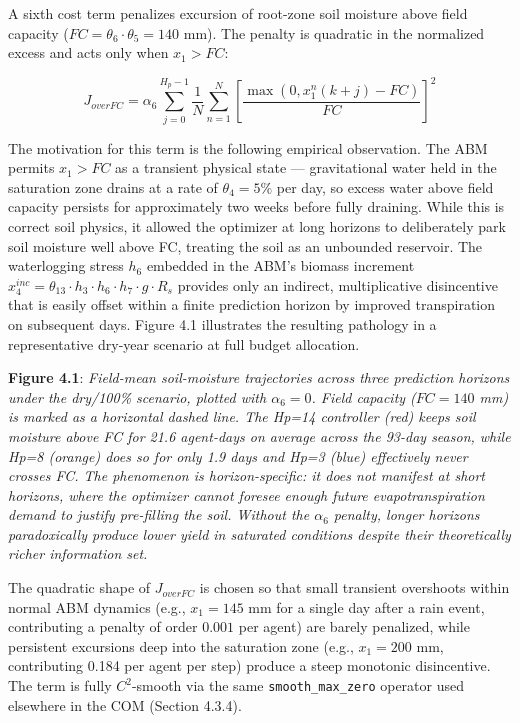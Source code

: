 A sixth cost term penalizes excursion of root-zone soil moisture above
field capacity (\(FC = \theta_6 \cdot \theta_5 = 140\) mm). The penalty
is quadratic in the normalized excess and acts only when \(x_1 > FC\):

\[J_{overFC} = \alpha_6 \sum_{j=0}^{H_p-1} \frac{1}{N} \sum_{n=1}^N \left[ \frac{\max(0, x_1^n(k+j) - FC)}{FC} \right]^2 \tag{15}\]

The motivation for this term is the following empirical observation. The
ABM permits \(x_1 > FC\) as a transient physical state --- gravitational
water held in the saturation zone drains at a rate of \(\theta_4 = 5\%\)
per day, so excess water above field capacity persists for approximately
two weeks before fully draining. While this is correct soil physics, it
allowed the optimizer at long horizons to deliberately park soil
moisture well above FC, treating the soil as an unbounded reservoir. The
waterlogging stress \(h_6\) embedded in the ABM's biomass increment
\(x_4^{inc} = \theta_{13} \cdot h_3 \cdot h_6 \cdot h_7 \cdot g \cdot R_s\)
provides only an indirect, multiplicative disincentive that is easily
offset within a finite prediction horizon by improved transpiration on
subsequent days. Figure 4.1 illustrates the resulting pathology in a
representative dry-year scenario at full budget allocation.

\textbf{Figure 4.1}: \emph{Field-mean soil-moisture trajectories across
three prediction horizons under the dry/100\% scenario, plotted with
\(\alpha_6 = 0\). Field capacity (\(FC = 140\) mm) is marked as a
horizontal dashed line. The Hp=14 controller (red) keeps soil moisture
above FC for 21.6 agent-days on average across the 93-day season, while
Hp=8 (orange) does so for only 1.9 days and Hp=3 (blue) effectively
never crosses FC. The phenomenon is horizon-specific: it does not
manifest at short horizons, where the optimizer cannot foresee enough
future evapotranspiration demand to justify pre-filling the soil.
Without the \(\alpha_6\) penalty, longer horizons paradoxically produce
lower yield in saturated conditions despite their theoretically richer
information set.}

The quadratic shape of \(J_{overFC}\) is chosen so that small transient
overshoots within normal ABM dynamics (e.g., \(x_1 = 145\) mm for a
single day after a rain event, contributing a penalty of order \(0.001\)
per agent) are barely penalized, while persistent excursions deep into
the saturation zone (e.g., \(x_1 = 200\) mm, contributing 0.184 per
agent per step) produce a steep monotonic disincentive. The term is
fully \(C^2\)-smooth via the same \texttt{smooth\_max\_zero} operator
used elsewhere in the COM (Section 4.3.4).

